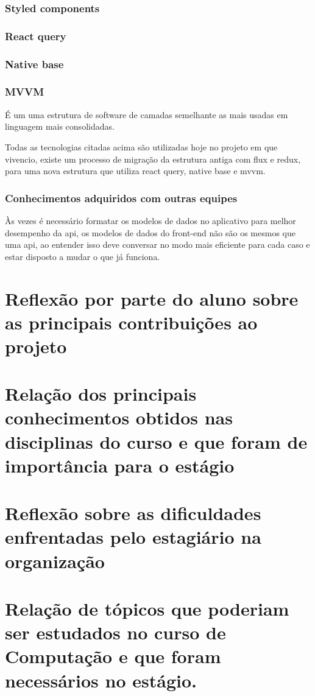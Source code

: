 \documentclass{ufersa}
\begin{document}
\subsubsection{Styled components}
\subsubsection{React query}
\subsubsection{Native base}
\subsubsection{MVVM}
	É um uma estrutura de software de camadas semelhante as mais usadas em linguagem mais consolidadas. 

Todas as tecnologias citadas acima são utilizadas hoje no projeto em que vivencio, existe um processo de migração da estrutura antiga com flux e redux, para uma nova estrutura que utiliza react query, native base e mvvm.

\subsubsection{Conhecimentos adquiridos com outras equipes}

Às vezes é necessário formatar os modelos de dados no aplicativo para melhor desempenho da api, os modelos de dados do front-end não são os mesmos que uma api, ao entender isso deve conversar no modo mais eficiente para cada caso e estar disposto a mudar o que já funciona. 

\section{Reflexão por parte do aluno sobre as principais contribuições ao projeto}
\section{Relação dos principais conhecimentos obtidos nas disciplinas do curso e que foram de importância para o estágio}
\section{Reflexão sobre as dificuldades enfrentadas pelo estagiário na organização}
\section{Relação de tópicos que poderiam ser estudados no curso de Computação e que foram necessários no estágio.}
\end{document}
